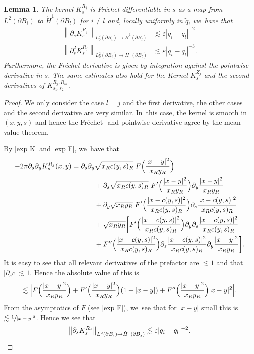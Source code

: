 \documentclass[JEP,XML,SOM,Unicode,published]{cedram}
\let\epsilon\varepsilon
\newtheorem{lemma}[theorem]{Lemma}
\theoremstyle{definition}
\newcommand\norm[1]{\left\lVert #1\right\rVert}
\newcommand\eq{=}
\let\de\partial
\let\eps\epsilon
\begin{document}
\begin{lemma}\label{deri K 2}
The kernel $K_s^{R_j}$ is Fréchet-differentiable in $s$ as a map from $L^2(\de B_i)$ to $\dot{H}^1(\de B_l)$ for $i\neq l$ and, locally uniformly in $\tilde{q}$, we~have that
\begin{align*}
\norm{\de_s K_s^{R_j}}_{L_0^2(\de B_i)\to \dot{H}^1(\de B_l)}&\lesssim \eps|q_i-q_l|^{-2}\\
\tag*{and}
\norm{\de_s^2 K_s^{R_j}}_{L_0^2(\de B_i)\to \dot{H}^1(\de B_l)}&\lesssim \eps|q_i-q_l|^{-3}.
\end{align*}
Furthermore, the Fréchet derivative is given by integration against the pointwise derivative in $s$. The same estimates also hold for the Kernel $K_s^{Z_j}$ and the second derivatives of $K_{s_1,s_2}^{R_j,R_m}$.
\end{lemma}
\begin{proof}
We only consider the case $l=j$ and the first derivative, the other cases and the second derivative are very similar. In~this case, the kernel is smooth in $(x,y,s)$ and hence the Fréchet- and pointwise derivative agree by \eg the mean value theorem.

By \eqref{exp K} and \eqref{exp F}, we~have that
\begin{align*}
-2\pi\de_s\de_yK_s^{R_j}(x,y)\eq \de_s\de_y&\sqrt{x_Rc(y,s)_R}\,\,F\Bigl(\frac{|x-y|^2}{x_Ry_R}\Bigr)\\
&+\de_s\sqrt{x_Rc(y,s)_R}\,\,F'\Bigl(\frac{|x-y|^2}{x_Ry_R}\Bigr)\de_y\frac{|x-y|^2}{x_Ry_R}\\
&+\de_y\sqrt{x_Ry_R}\,\,F'\Bigl(\frac{|x-c(y,s)|^2}{x_Rc(y,s)_R}\Bigr)\de_s\frac{|x-c(y,s)|^2}{x_Rc(y,s)_R}\\
&+\sqrt{x_Ry_R}\biggl[F'\Bigl(\frac{|x-c(y,s)|^2}{x_Rc(y,s)_R}\Bigr)\de_y\de_s\frac{|x-c(y,s)|^2}{x_Rc(y,s)_R}\\
&+F''\Bigl(\frac{|x-c(y,s)|^2}{x_Rc(y,s)_R}\Bigr)\de_s\frac{|x-c(y,s)|^2}{x_Rc(y,s)_R}\de_y\frac{|x-y|^2}{x_Ry_R}\biggr].
\end{align*}
It is easy to see that all relevant derivatives of the prefactor are $\lesssim 1$ and that $|\de_s c|\lesssim 1$. Hence the absolute value of this is
\begin{align*}
\lesssim \Bigl |F \Bigl(\frac{|x-y|^2}{x_Ry_R} \Bigr)+F'\Bigl(\frac{|x-y|^2}{x_Ry_R} \Bigr)(1+|x-y|)+F''\Bigl(\frac{|x-y|^2}{x_Ry_R} \Bigr)|x-y|^2 \Bigr|.
\end{align*}
From the asymptotics of $F$ (see \eqref{exp F}), we~see that for $|x-y|$ small this is $\lesssim \sfrac{1}{|x-y|^2}$.
Hence we see that
\[
\norm{\de_sK_s^{R_j}}_{L^2(\de B_i)\to \dot{H}^1(\de B_j)}\lesssim \eps |q_i-q_l|^{-2}.\qedhere
\]
\end{proof}
\end{document}
